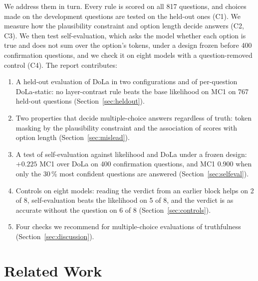 \documentclass[11pt]{article}
\newcommand{\cha}[1]{\textsf{C#1}}
\newcommand{\method}{per-question DoLa-static}
\begin{document}
We address them in turn. Every rule is scored on all 817 questions, and choices made on the development questions
are tested on the held-out ones (\cha1). We measure how the plausibility constraint and option length decide answers
(\cha2, \cha3). We then test self-evaluation, which asks the model whether each option is true and does not sum over
the option's tokens, under a design frozen before 400 confirmation questions, and we check it on eight models with a
question-removed control (\cha4). The report contributes:
\begin{enumerate}
\item A held-out evaluation of DoLa in two configurations and of \method{}: no layer-contrast rule beats the base
  likelihood on MC1 on 767 held-out questions (Section~\ref{sec:heldout}).
\item Two properties that decide multiple-choice answers regardless of truth: token masking by the plausibility
  constraint and the association of scores with option length (Section~\ref{sec:mislead}).
\item A test of self-evaluation against likelihood and DoLa under a frozen design: $+0.225$ MC1 over DoLa on 400
  confirmation questions, and MC1 0.900 when only the 30\,\% most confident questions are answered
  (Section~\ref{sec:selfeval}).
\item Controls on eight models: reading the verdict from an earlier block helps on 2 of 8, self-evaluation beats
  the likelihood on 5 of 8, and the verdict is as accurate without the question on 6 of 8
  (Section~\ref{sec:controls}).
\item Four checks we recommend for multiple-choice evaluations of truthfulness (Section~\ref{sec:discussion}).
\end{enumerate}

\section{Related Work}
\label{sec:related}
\end{document}
